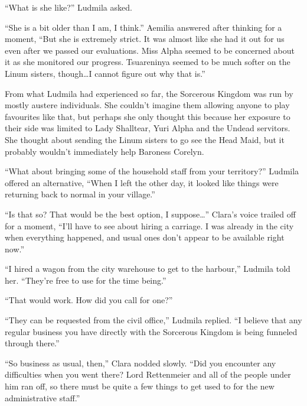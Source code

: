 

“What is she like?” Ludmila asked.

 

“She is a bit older than I am, I think.” Aemilia answered after thinking for a moment, “But she is extremely strict. It was almost like she had it out for us even after we passed our evaluations. Miss Alpha seemed to be concerned about it as she monitored our progress. Tsuareninya seemed to be much softer on the Linum sisters, though…I cannot figure out why that is.”

 

From what Ludmila had experienced so far, the Sorcerous Kingdom was run by mostly austere individuals. She couldn’t imagine them allowing anyone to play favourites like that, but perhaps she only thought this because her exposure to their side was limited to Lady Shalltear, Yuri Alpha and the Undead servitors. She thought about sending the Linum sisters to go see the Head Maid, but it probably wouldn’t immediately help Baroness Corelyn.

 

“What about bringing some of the household staff from your territory?” Ludmila offered an alternative, “When I left the other day, it looked like things were returning back to normal in your village.”

 

“Is that so? That would be the best option, I suppose…” Clara’s voice trailed off for a moment, “I’ll have to see about hiring a carriage. I was already in the city when everything happened, and usual ones don’t appear to be available right now.”

 

“I hired a wagon from the city warehouse to get to the harbour,” Ludmila told her. “They’re free to use for the time being.”

 

“That would work. How did you call for one?”

 

“They can be requested from the civil office,” Ludmila replied. “I believe that any regular business you have directly with the Sorcerous Kingdom is being funneled through there.”

 

“So business as usual, then,” Clara nodded slowly. “Did you encounter any difficulties when you went there? Lord Rettenmeier and all of the people under him ran off, so there must be quite a few things to get used to for the new administrative staff.”

